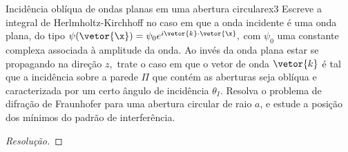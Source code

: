 \begin{exercício}{Incidência oblíqua de ondas planas em uma abertura circular}{ex3}
    Escreve a integral de Herlmholtz-Kirchhoff no caso em que a onda incidente é uma onda plana, do tipo \(\psi(\vetor{\x}) = \psi_0 e^{i \vetor{k} \cdot \vetor{\x}},\) com \(\psi_0\) uma constante complexa associada à amplitude da onda. Ao invés da onda plana estar se propagando na direção \(z,\) trate o caso em que o vetor de onda \(\vetor{k}\) é tal que a incidência sobre a parede \(\Pi\) que contém as aberturas seja oblíqua e caracterizada por um certo ângulo de incidência \(\theta_I\). Resolva o problema de difração de Fraunhofer para uma abertura circular de raio \(a\), e estude a posição dos mínimos do padrão de interferência.
\end{exercício}
\begin{proof}[Resolução]
    
\end{proof}
